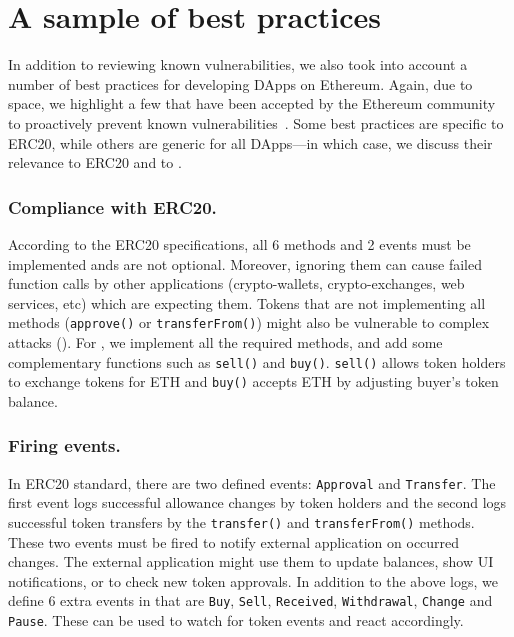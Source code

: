 
\section{A sample of best practices}\label{section:bp}

In addition to reviewing known vulnerabilities, we also took into account a number of best practices for developing DApps on Ethereum. Again, due to space, we highlight a few that have been accepted by the Ethereum community to proactively prevent known vulnerabilities~\cite{TokenBP}. Some best practices are specific to ERC20, while others are generic for all DApps---in which case, we discuss their relevance to ERC20 and to \sys.

\subsubsection{Compliance with ERC20.}

According to the ERC20 specifications, all 6 methods and 2 events must be implemented ands are not optional. Moreover, ignoring them can cause failed function calls by other applications (\ie crypto-wallets, crypto-exchanges, web services, etc) which are expecting them. Tokens that are not implementing all methods (\eg \texttt{approve()} or \texttt{transferFrom()}) might also be vulnerable to complex attacks (\cf  \cite{DEPOSafe}). For \sys, we implement all the required methods, and add some complementary functions such as \texttt{sell()} and \texttt{buy()}. \texttt{sell()} allows token holders to exchange tokens for ETH and \texttt{buy()} accepts ETH by adjusting buyer's token balance.

\subsubsection{Firing events.}

In ERC20 standard, there are two defined events: \texttt{Approval} and \texttt{Transfer}. The first event logs successful allowance changes by token holders and the second logs successful token transfers by the \texttt{transfer()} and \texttt{transferFrom()} methods. These two events must be fired to notify external application on occurred changes. The external application might use them to update balances, show UI notifications, or to check new token approvals. In addition to the above logs, we define 6 extra events in \sys that are \texttt{Buy}, \texttt{Sell}, \texttt{Received}, \texttt{Withdrawal}, \texttt{Change} and \texttt{Pause}. These can be used to watch for token events and react accordingly.

